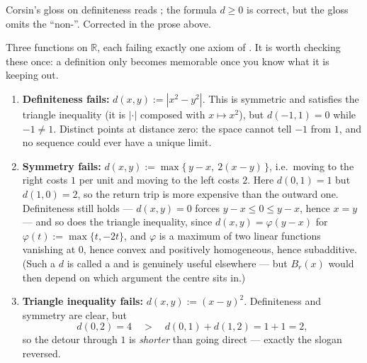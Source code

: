 \begin{ainote}
Corsin's gloss on definiteness reads ; the formula $d \geq 0$ is
correct, but the gloss omits the ``non-''. Corrected in the prose above.
\end{ainote}

\begin{center}
\end{center}

\begin{aiexample}
\label{ex:metric_axioms_are_needed}
Three functions on $\mathbb{R}$, each failing exactly one axiom of
. It is worth checking these once: a definition only becomes memorable
once you know what it is keeping out.
\begin{enumerate}[label=\textbf{(\alph*)}]
  \item \textbf{Definiteness fails:} $d(x,y) := |x^2-y^2|$. This is symmetric and satisfies the
    triangle inequality (it is $|\cdot|$ composed with $x \mapsto x^2$), but
    $d(-1,1) = 0$ while $-1 \neq 1$. Distinct points at distance zero: the space cannot tell
    $-1$ from $1$, and no sequence could ever have a unique limit.
  \item \textbf{Symmetry fails:} $d(x,y) := \max\{\,y-x,\ 2(x-y)\,\}$, i.e.\ moving to the right
    costs $1$ per unit and moving to the left costs $2$. Here $d(0,1)=1$ but $d(1,0)=2$, so the
    return trip is more expensive than the outward one. Definiteness still holds ---
    $d(x,y) = 0$ forces $y-x \leq 0 \leq y-x$, hence $x=y$ --- and so does the triangle
    inequality, since $d(x,y) = \varphi(y-x)$ for $\varphi(t) := \max\{t,-2t\}$, and $\varphi$
    is a maximum of two linear functions vanishing at $0$, hence convex and positively
    homogeneous, hence subadditive. (Such a $d$ is called a  and is
    genuinely useful elsewhere --- but $B_r(x)$ would then depend on which argument the centre
    sits in.)
  \item \textbf{Triangle inequality fails:} $d(x,y) := (x-y)^2$. Definiteness and symmetry are
    clear, but
    \[d(0,2) = 4 \quad > \quad d(0,1)+d(1,2) = 1+1 = 2,\]
    so the detour through $1$ is \emph{shorter} than going direct --- exactly the
     slogan reversed.
\end{enumerate}
\end{aiexample}

